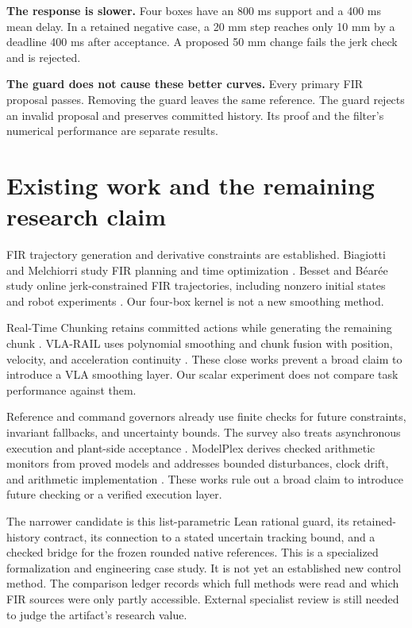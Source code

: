 \documentclass[11pt,letterpaper]{article}
\begin{document}
\textbf{The response is slower.} Four boxes have an 800 ms support and a 400 ms mean delay. In a retained negative case, a 20 mm step reaches only 10 mm by a deadline 400 ms after acceptance. A proposed 50 mm change fails the jerk check and is rejected.

\textbf{The guard does not cause these better curves.} Every primary FIR proposal passes. Removing the guard leaves the same reference. The guard rejects an invalid proposal and preserves committed history. Its proof and the filter's numerical performance are separate results.

\newpage


\newpage
{\small

}

\newpage


\newpage
{\small
\section{Existing work and the remaining research claim}
FIR trajectory generation and derivative constraints are established. Biagiotti and Melchiorri study FIR planning and time optimization \cite{fir2012,fir2019}. Besset and B\'ear\'ee study online jerk-constrained FIR trajectories, including nonzero initial states and robot experiments \cite{fir2017}. Our four-box kernel is not a new smoothing method.

Real-Time Chunking retains committed actions while generating the remaining chunk \cite{rtc}. VLA-RAIL uses polynomial smoothing and chunk fusion with position, velocity, and acceleration continuity \cite{rail}. These close works prevent a broad claim to introduce a VLA smoothing layer. Our scalar experiment does not compare task performance against them.

Reference and command governors already use finite checks for future constraints, invariant fallbacks, and uncertainty bounds. The survey also treats asynchronous execution and plant-side acceptance \cite{governors}. ModelPlex derives checked arithmetic monitors from proved models and addresses bounded disturbances, clock drift, and arithmetic implementation \cite{modelplex}. These works rule out a broad claim to introduce future checking or a verified execution layer.

The narrower candidate is this list-parametric Lean rational guard, its retained-history contract, its connection to a stated uncertain tracking bound, and a checked bridge for the frozen rounded native references. This is a specialized formalization and engineering case study. It is not yet an established new control method. The comparison ledger records which full methods were read and which FIR sources were only partly accessible. External specialist review is still needed to judge the artifact's research value.

}
\end{document}
